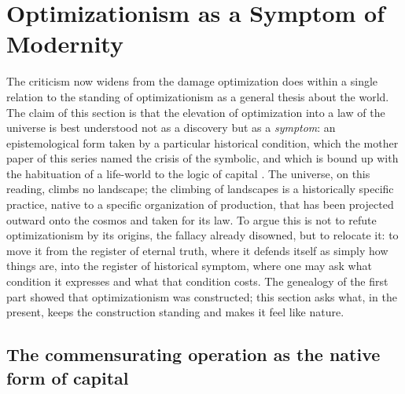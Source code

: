 \section{Optimizationism as a Symptom of Modernity}
\label{p25:sec:symptom}

\noindent
The criticism now widens from the damage optimization does within a single relation to the standing of optimizationism as a general thesis about the world. The claim of this section is that the elevation of optimization into a law of the universe is best understood not as a discovery but as a \emph{symptom}: an epistemological form taken by a particular historical condition, which the mother paper of this series named the crisis of the symbolic, and which is bound up with the habituation of a life-world to the logic of capital \parencite{wan2024grb}. The universe, on this reading, climbs no landscape; the climbing of landscapes is a historically specific practice, native to a specific organization of production, that has been projected outward onto the cosmos and taken for its law. To argue this is not to refute optimizationism by its origins, the fallacy already disowned, but to relocate it: to move it from the register of eternal truth, where it defends itself as simply how things are, into the register of historical symptom, where one may ask what condition it expresses and what that condition costs. The genealogy of the first part showed that optimizationism was constructed; this section asks what, in the present, keeps the construction standing and makes it feel like nature.

\subsection*{The commensurating operation as the native form of capital}

